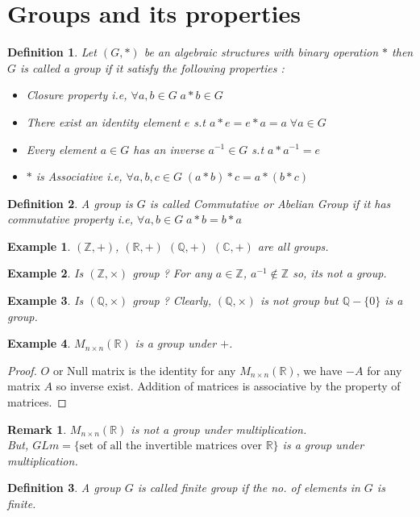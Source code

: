\documentclass[12pt,a4paper]{article}
\newcommand{\R}{\mathbb{R}}
\newcommand{\Z}{\mathbb{Z}}
\newcommand{\C}{\mathbb{C}}
\newcommand{\Q}{\mathbb{Q}}
\newtheorem{defn}{Definition}
\newtheorem{rem}{Remark}
\newtheorem{ex}{Example}
\begin{document}
  \section{Groups and its properties}
  \begin{defn}
    Let $(G,*)$ be an algebraic structures with binary operation $*$ then $G$ is called a group if it satisfy the following properties :
    \begin{itemize}
      \item Closure property i.e, $\forall a,b \in G\; a*b\in G$
      \item There exist an identity element $e$ s.t $a*e=e*a=a\; \forall a\in G$
      \item Every element $a\in G$ has an inverse $a^{-1}\in G$ s.t $a*a^{-1}=e$
      \item $*$ is Associative i.e, $\forall a,b,c \in G\; (a*b)*c=a*(b*c)$
    \end{itemize}
  \end{defn}
  \begin{defn}
    A group is $G$ is called Commutative or Abelian Group if it has commutative property i.e, $\forall a,b\in G\; a*b=b*a$
  \end{defn}
  \begin{ex}
    $(\Z,+)$, $(\R,+)$  $(\Q,+)$  $(\C,+)$ are all groups.
  \end{ex}
  \begin{ex}
    Is $(\Z,\times)$ group ? For any $a\in \Z$, $a^{-1}\notin \Z$ so, its not a group.
  \end{ex}
  \begin{ex}
    Is $(\Q,\times)$ group ? Clearly, $(\Q,\times)$ is not group but $\Q-\{0\}$ is a group.
  \end{ex}
  \begin{ex}
    $M_{n\times n}(\R)$ is a group under $+$.
  \end{ex}
  \begin{proof}
    $O$ or Null matrix is the identity for any $M_{n\times n}(\R)$, we have $-A$ for any matrix $A$ so inverse exist. Addition of matrices is associative by the property of matrices. 
  \end{proof}
  \begin{rem}
      $M_{n\times n}(\R)$ is not a group under multiplication.\\ But, $GLm = \{\text{set of all the invertible matrices over } \R\}$ is a group under multiplication.
  \end{rem}
  \begin{defn}
    A group $G$ is called finite group if the no. of elements in $G$ is finite.
  \end{defn}
\end{document}
